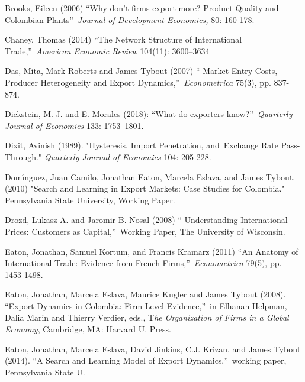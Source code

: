 \documentclass[12pt]{article}
\begin{document}
\begin{description}
\item Brooks, Eileen (2006) \textquotedblleft Why don't firms export more?
Product Quality and Colombian Plants\textquotedblright\ \textit{Journal of
Development Economics,} 80: 160-178.

\item Chaney, Thomas (2014) \textquotedblleft The Network Structure of
International Trade,\textquotedblright\ \textit{American Economic Review}
104(11): 3600--3634

\item Das, Mita, Mark Roberts and James Tybout (2007) \textquotedblleft
Market Entry Costs, Producer Heterogeneity and Export
Dynamics,\textquotedblright\ \textit{Econometrica }75(3), pp. 837-874.

\item Dickstein, M. J. and E. Morales (2018): \textquotedblleft What do
exporters know?\textquotedblright\ \textit{Quarterly Journal of Economics}
133: 1753--1801.

\item Dixit, Avinish (1989). "Hysteresis, Import Penetration, and\ Exchange
Rate Pass-Through." \textit{Quarterly Journal of Economics} 104: 205-228.

\item Dom\'{\i}nguez, Juan Camilo, Jonathan Eaton, Marcela Eslava, and James
Tybout. (2010) "Search and Learning in Export Markets: Case Studies for
Colombia." Pennsylvania State University, Working Paper.

\item Drozd, Lukasz A. and Jaromir B. Nosal (2008) \textquotedblleft
Understanding International Prices: Customers as Capital,\textquotedblright\
Working Paper, The University of Wisconsin.

\item Eaton, Jonathan, Samuel Kortum, and Francis Kramarz (2011)
\textquotedblleft An Anatomy of International Trade: Evidence from French
Firms,\textquotedblright\ \textit{Econometrica} 79(5), pp. 1453-1498.

\item Eaton, Jonathan, Marcela Eslava, Maurice Kugler and James Tybout
(2008). \textquotedblleft Export Dynamics in Colombia: Firm-Level
Evidence,\textquotedblright\ in Elhanan Helpman, Dalia Marin and Thierry
Verdier, eds., T\textit{he Organization of Firms in a Global Economy},
Cambridge, MA: Harvard U. Press.

\item Eaton, Jonathan, Marcela Eslava, David Jinkins, C.J. Krizan, and James
Tybout (2014). \textquotedblleft A Search and Learning Model of Export
Dynamics,\textquotedblright\ working paper, Pennsylvania State U.


\end{description}
\end{document}

